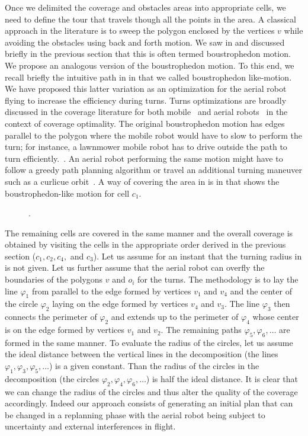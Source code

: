 Once we delimited the coverage and obstacles areas into appropriate cells, we need to define the tour that travels though all the points in the area. A classical approach in the literature is to sweep the polygon enclosed by the vertices $v$ while avoiding the obstacles using back and forth motion. We saw in  and discussed briefly in the previous section that this is often termed boustrophedon motion. We propose an analogous version of the boustrophedon motion. To this end, we recall briefly the intuitive path in  in  that we called boustrophedon like-motion. We have proposed this latter variation as an optimization for the aerial robot flying to increase the efficiency during turns. Turns optimizations are broadly discussed in the coverage literature for both mobile~\citep{huang2001optimal} and aerial robots~\citep{artemenko2016energy,li2011coverage} in the context of coverage optimality. The original boustrophedon motion has edges parallel to the polygon where the mobile robot would have to slow to perform the turn; for instance, a lawnmower mobile robot has to drive outside the path to turn efficiently.~\citep{huang2001optimal}. An aerial robot performing the same motion might have to follow a greedy path planning algorithm or travel an additional turning maneuver such as a curlicue orbit~\citep{xu2011optimal,xu2014efficient}. A way of covering the area in  is in  that shows the boustrophedon-like motion for cell $c_1$.
\begin{figure}[h]
  \centering
  \selectfont
  
  \caption[.]{.}
  \label{fig:bm}
\end{figure}
The remaining cells are covered in the same manner and the overall coverage is obtained by visiting the cells in the appropriate order derived in the previous section ($c_1,c_2,c_4,$ and $c_3$). Let us assume for an instant that the turning radius in  is not given. Let us further assume that the aerial robot can overfly the boundaries of the polygons $v$ and $o_i$ for the turns. The methodology is to lay the line $\varphi_1$ from  parallel to the edge formed by vertices $v_1$ and $v_4$ and the center of the circle $\varphi_2$ laying on the edge formed by vertices $v_4$ and $v_3$. The line $\varphi_3$ then connects the perimeter of $\varphi_2$ and extends up to the perimeter of $\varphi_4$ whose center is on the edge formed by vertices $v_1$ and $v_2$. The remaining paths $\varphi_5,\varphi_6,\dots$ are formed in the same manner. To evaluate the radius of the circles, let us assume the ideal distance between the vertical lines in the decomposition (the lines $\varphi_1,\varphi_3,\varphi_5,\dots$) is a given constant. Than the radius of the circles in the decomposition (the circles $\varphi_2,\varphi_4,\varphi_6,\dots$) is half the ideal distance. It is clear that we can change the radius of the circles and thus alter the quality of the coverage accordingly. Indeed our approach consists of generating an initial plan that can be changed in a replanning phase with the aerial robot being subject to uncertainty and external interferences in flight.

